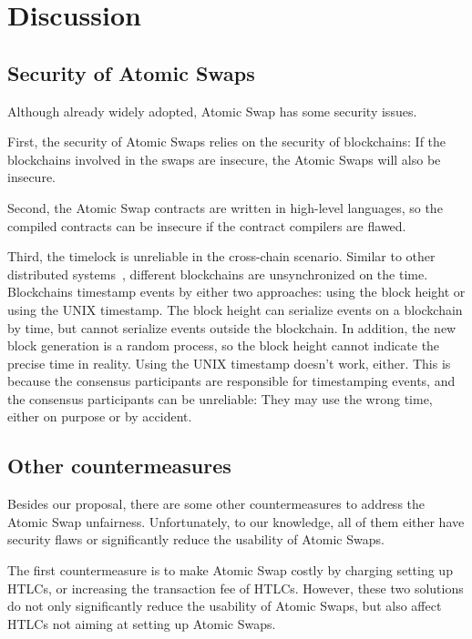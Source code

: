\section{Discussion}
\label{sec:discussion}

\subsection{Security of Atomic Swaps}

Although already widely adopted, Atomic Swap has some security issues.

First, the security of Atomic Swaps relies on the security of blockchains:
If the blockchains involved in the swaps are insecure, the Atomic Swaps will also be insecure.

Second, the Atomic Swap contracts are written in high-level languages, so the compiled contracts can be insecure if the contract compilers are flawed.

Third, the timelock is unreliable in the cross-chain scenario.
Similar to other distributed systems~\cite{coulouris2012distributed}, different blockchains are unsynchronized on the time.
Blockchains timestamp events by either two approaches: using the block height or using the UNIX timestamp.
The block height can serialize events on a blockchain by time, but cannot serialize events outside the blockchain.
In addition, the new block generation is a random process, so the block height cannot indicate the precise time in reality.
Using the UNIX timestamp doesn't work, either.
This is because the consensus participants are responsible for timestamping events, and the consensus participants can be unreliable: They may use the wrong time, either on purpose or by accident.


\subsection{Other countermeasures}

Besides our proposal, there are some other countermeasures to address the Atomic Swap unfairness.
Unfortunately, to our knowledge, all of them either have security flaws or significantly reduce the usability of Atomic Swaps.

The first countermeasure is to make Atomic Swap costly by charging setting up HTLCs, or increasing the transaction fee of HTLCs.
However, these two solutions do not only significantly reduce the usability of Atomic Swaps, but also affect HTLCs not aiming at setting up Atomic Swaps.

